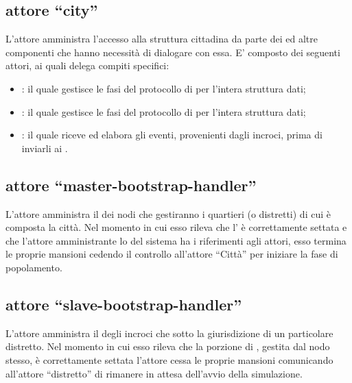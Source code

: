 \subsection*{attore ``city''}
\label{soluzione-propoposta-architettura-city}
L'attore amministra l'accesso alla struttura cittadina da parte dei  ed altre componenti che hanno necessità di dialogare con essa. E' composto dei seguenti attori, ai quali delega compiti specifici:

\begin{itemize}
\item{: il quale gestisce le fasi del protocollo di  per l'intera struttura dati;}
\item{: il quale gestisce le fasi del protocollo di  per l'intera struttura dati;}
\item{: il quale riceve ed elabora gli eventi, provenienti dagli incroci, prima di inviarli ai .}
\end{itemize}

\subsection*{attore ``master-bootstrap-handler''}
\label{soluzione-poposta-architettura-master-bootstrap-handler}
L'attore amministra il  dei nodi che gestiranno i quartieri (o distretti) di cui è composta la città. Nel momento in cui esso rileva che l' è correttamente settata e che l'attore amministrante lo  del sistema ha i riferimenti agli attori, esso termina le proprie mansioni cedendo il controllo all'attore ``Città'' per iniziare la fase di popolamento.

\subsection*{attore ``slave-bootstrap-handler''}
\label{soluzione-poposta-architettura-slave-bootstrap-handler}
L'attore amministra il  degli incroci che sotto la giurisdizione di un particolare distretto. Nel momento in cui esso rileva che la porzione di , gestita dal nodo stesso, è correttamente settata l'attore cessa le proprie mansioni comunicando all'attore ``distretto'' di rimanere in attesa dell'avvio della simulazione.


